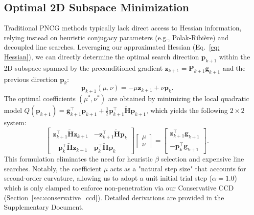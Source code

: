 \documentclass[acmtog,anonymous,review,screen,nonacm]{acmart}
\begin{document}
\subsection{Optimal 2D Subspace Minimization}
\label{sec:subspace_minimization}

Traditional PNCG methods typically lack direct access to Hessian information, relying instead on heuristic conjugacy parameters (e.g., Polak-Ribière) and decoupled line searches. Leveraging our approximated Hessian (Eq.~\ref{eq: Hessian}), we can directly determine the optimal search direction $\mathbf{p}_{k+1}$ within the 2D subspace spanned by the preconditioned gradient $\mathbf{z}_{k+1} = \mathbf{P}_{k+1} \mathbf{g}_{k+1}$ and the previous direction $\mathbf{p}_k$:
\begin{equation}
    \mathbf{p}_{k+1}(\mu, \nu) = -\mu \mathbf{z}_{k+1} + \nu \mathbf{p}_k.
    \label{eq:subspace_dir}
\end{equation}
The optimal coefficients $(\mu^*, \nu^*)$ are obtained by minimizing the local quadratic model $Q(\mathbf{p}_{k+1}) = \mathbf{g}_{k+1}^\top \mathbf{p}_{k+1} + \frac{1}{2} \mathbf{p}_{k+1}^\top \tilde{\mathbf{H}} \mathbf{p}_{k+1}$, which yields the following $2 \times 2$ system:
\begin{equation}
    \begin{bmatrix} 
    \mathbf{z}_{k+1}^\top \tilde{\mathbf{H}} \mathbf{z}_{k+1} & -\mathbf{z}_{k+1}^\top \tilde{\mathbf{H}} \mathbf{p}_k \\ 
    -\mathbf{p}_k^\top \tilde{\mathbf{H}} \mathbf{z}_{k+1} & \mathbf{p}_k^\top \tilde{\mathbf{H}} \mathbf{p}_k 
    \end{bmatrix} 
    \begin{bmatrix} \mu \\ \nu \end{bmatrix} 
    = 
    \begin{bmatrix} \mathbf{z}_{k+1}^\top \mathbf{g}_{k+1} \\ -\mathbf{p}_k^\top \mathbf{g}_{k+1} \end{bmatrix}.
    \label{eq:2x2_system}
\end{equation}
This formulation eliminates the need for heuristic $\beta$ selection and expensive line searches. Notably, the coefficient $\mu$ acts as a "natural step size" that accounts for second-order curvature, allowing us to adopt a unit initial trial step ($\alpha = 1.0$) which is only clamped to enforce non-penetration via our Conservative CCD (Section~\ref{sec:conservative_ccd}). 
Detailed derivations are provided in the Supplementary Document.
\end{document}
